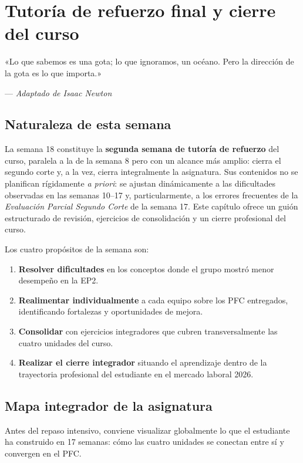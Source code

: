 \chapter{Tutoría de refuerzo final y cierre del curso}
\label{cap:semana18}

\epigraph{«Lo que sabemos es una gota; lo que ignoramos, un océano.
Pero la dirección de la gota es lo que importa.»}{--- \textit{Adaptado de
Isaac Newton}}

\section*{Naturaleza de esta semana}
La semana 18 constituye la \textbf{segunda semana de tutoría de
refuerzo} del curso, paralela a la de la semana 8 pero con un alcance
más amplio: cierra el segundo corte y, a la vez, cierra integralmente
la asignatura. Sus contenidos no se planifican rígidamente
\emph{a priori}: se ajustan dinámicamente a las dificultades observadas
en las semanas 10--17 y, particularmente, a los errores frecuentes de
la \emph{Evaluación Parcial Segundo Corte} de la semana 17. Este
capítulo ofrece un guión estructurado de revisión, ejercicios de
consolidación y un cierre profesional del curso.

Los cuatro propósitos de la semana son:

\begin{enumerate}
\item \textbf{Resolver dificultades} en los conceptos donde el grupo
mostró menor desempeño en la EP2.
\item \textbf{Realimentar individualmente} a cada equipo sobre los
PFC entregados, identificando fortalezas y oportunidades de mejora.
\item \textbf{Consolidar} con ejercicios integradores que cubren
transversalmente las cuatro unidades del curso.
\item \textbf{Realizar el cierre integrador} situando el aprendizaje
dentro de la trayectoria profesional del estudiante en el mercado
laboral 2026.
\end{enumerate}

\section{Mapa integrador de la asignatura}

Antes del repaso intensivo, conviene visualizar
globalmente lo que el estudiante ha construido en 17 semanas: cómo
las cuatro unidades se conectan entre sí y convergen en el PFC.


